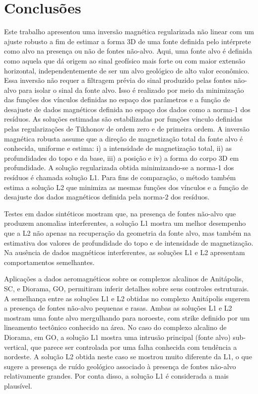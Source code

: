 \chapter{Conclusões}

Este trabalho apresentou uma inversão magnética regularizada não linear com um ajuste robusto a fim de estimar a forma 3D de uma fonte definida pelo intérprete como alvo na presença ou não de fontes não-alvo.
Aqui, uma fonte alvo é definida como aquela que dá origem ao sinal geofísico mais forte ou com maior extensão horizontal, independentemente de ser um alvo geológico de alto valor econômico.
Essa inversão não requer a filtragem prévia do sinal produzido pelas fontes não-alvo para isolar o sinal da fonte alvo.
Isso é realizado por meio da minimização das funções dos vínculos definidas no espaço dos parâmetros e a função de desajuste de dados magnéticos definida no espaço dos dados como a norma-1 dos resíduos.
As soluções estimadas são estabilizadas por funções vínculo definidas pelas regularizações de Tikhonov de ordem zero e de primeira ordem.
A inversão magnética robusta assume que a direção de magnetização total da fonte alvo é conhecida, uniforme e estima: i) a intensidade de magnetização total, ii) as profundidades do topo e da base, iii) a posição e iv) a forma do corpo 3D em profundidade.
A solução regularizada obtida minimizando-se a norma-1 dos resíduos é chamada solução L1.
Para fins de comparação, o método também estima a solução L2 que minimiza as mesmas funções dos vínculos e a função de desajuste dos dados magnéticos definida pela norma-$2$ dos resíduos.

Testes em dados sintéticos mostram que, na presença de fontes não-alvo que produzem anomalias interferentes, a solução L1 mostra um melhor desempenho que a L2 não apenas na recuperação da geometria da fonte alvo, mas também na estimativa dos valores de profundidade do topo e de intensidade de magnetização.
Na ausência de dados magnéticos interferentes, as soluções L1 e L2 apresentam comportamentos semelhantes.

Aplicações a dados aeromagnéticos sobre os complexos alcalinos de Anitápolis, SC, e Diorama, GO, permitiram inferir detalhes sobre seus controles estruturais.
A semelhança entre as soluções L1 e L2 obtidas no complexo Anitápolis sugerem a presença de fontes não-alvo pequenas e rasas.
Ambas as soluções L1 e L2 mostram uma fonte alvo mergulhando para noroeste, com strike definido por um lineamento tectônico conhecido na área.
No caso do complexo alcalino de Diorama, em GO, a solução L1 mostra uma intrusão principal (fonte alvo) sub-vertical, que parece ser controlada por uma falha conhecida com tendência a nordeste.
A solução L2 obtida neste caso se mostrou muito diferente da L1,
o que sugere a presença
de ruído geológico
associado à presença
de fontes não-alvo
relativamente grandes.
Por conta disso, a solução L1 é considerada
a mais plausível.

